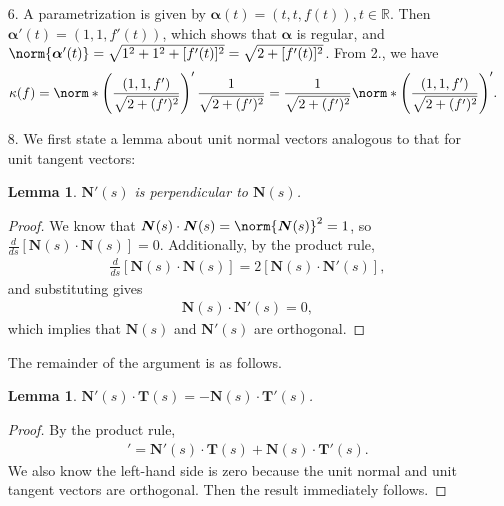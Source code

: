 \documentclass[a4paper,12pt]{article}
\newcommand{\bs}{\boldsymbol}
\newtheorem{lemma}[theorem]{Lemma}
\theoremstyle{remark}
\begin{document}
\begin{enumerate}
    \item[6.]
        A parametrization is given by $\bs{\alpha}(t) = (t, t, f(t)), t \in \mathbb{R}$. Then $\bs{\alpha}'(t) = (1, 1, f'(t))$, which shows that $\bs{\alpha}$ is regular, and $\norm{\bs{\alpha}'(t)} = \sqrt{1^2 + 1^2 + [f'(t)]^2} = \sqrt{2 + [f'(t)]^2}$. From 2., we have
        \begin{align*}
            \kappa(f) &= \norm*{\left( \frac{(1, 1, f')}{\sqrt{2 + (f')^2}} \right)' \frac{1}{\sqrt{2 + (f')^2}}}
            = \frac{1}{\sqrt{2 + (f')^2}} \norm*{\left( \frac{(1, 1, f')}{\sqrt{2 + (f')^2}} \right)'}.
        \end{align*}

    \item[8.]
        We first state a lemma about unit normal vectors analogous to that for unit tangent vectors:
        \begin{lemma} \label{lem:N-perp}
            $\bs{N}'(s)$ is perpendicular to $\bs{N}(s)$.
        \end{lemma}
        \begin{proof}
            We know that $\bs{N}(s) \cdot \bs{N}(s) = \norm{\bs{N}(s)}^2 = 1$, so $\frac{d}{ds} [\bs{N}(s) \cdot \bs{N}(s)] = 0$. Additionally, by the product rule,
            \begin{align*}
                \frac{d}{ds} [\bs{N}(s) \cdot \bs{N}(s)] = 2[\bs{N}(s) \cdot \bs{N}'(s)],
            \end{align*}
            and substituting gives
            \begin{align*}
                \bs{N}(s) \cdot \bs{N}'(s) = 0,
            \end{align*}
            which implies that $\bs{N}(s)$ and $\bs{N}'(s)$ are orthogonal.
        \end{proof}
        The remainder of the argument is as follows.
        \begin{lemma}
            $\bs{N}'(s) \cdot \bs{T}(s) = -\bs{N}(s) \cdot \bs{T}'(s)$.
        \end{lemma}
        \begin{proof}
            By the product rule,
            \begin{align*}
                [\bs{N}(s) \cdot \bs{T}(s)]' = \bs{N}'(s) \cdot \bs{T}(s) + \bs{N}(s) \cdot \bs{T}'(s).
            \end{align*}
            We also know the left-hand side is zero because the unit normal and unit tangent vectors are orthogonal. Then the result immediately follows.
        \end{proof}

\end{enumerate}
\end{document}
